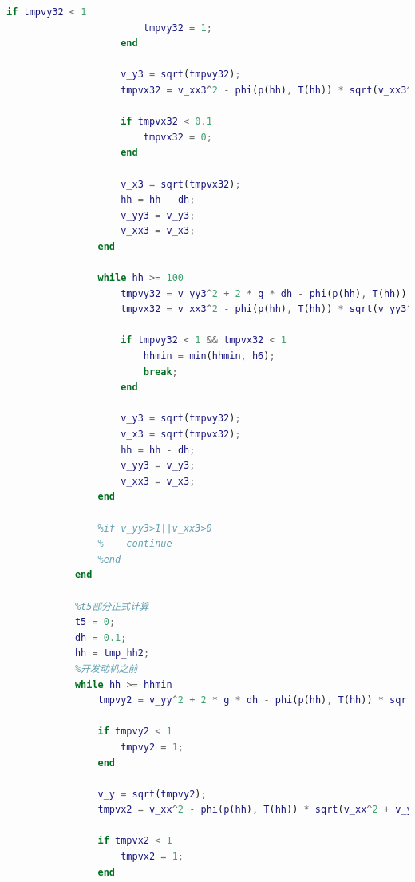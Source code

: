 \documentclass[hyperref,a4paper,UTF8]{ctexart}
\begin{document}
\begin{lstlisting}[language=Matlab]
                    if tmpvy32 < 1
                        tmpvy32 = 1;
                    end

                    v_y3 = sqrt(tmpvy32);
                    tmpvx32 = v_xx3^2 - phi(p(hh), T(hh)) * sqrt(v_xx3^2 + v_yy3^2) * (S_floor + S_para) * dh * v_xx3^2 / ((m - m_floor - m_para - m_hide) * v_yy3);

                    if tmpvx32 < 0.1
                        tmpvx32 = 0;
                    end

                    v_x3 = sqrt(tmpvx32);
                    hh = hh - dh;
                    v_yy3 = v_y3;
                    v_xx3 = v_x3;
                end

                while hh >= 100
                    tmpvy32 = v_yy3^2 + 2 * g * dh - phi(p(hh), T(hh)) * sqrt(v_yy3^2 + v_xx3^2) * S_floor * dh * v_yy3 / (m - m_floor - m_para - m_hide) - 2 * 7500 * dh * v_yy3 / ((m - m_floor - m_para - m_hide) * sqrt(v_yy3^2 + v_xx3^2));
                    tmpvx32 = v_xx3^2 - phi(p(hh), T(hh)) * sqrt(v_yy3^2 + v_xx3^2) * S_floor * dh * v_xx3^2 / (v_yy3 * (m - m_floor - m_para - m_hide)) - 2 * 7500 * dh * v_xx3^2 / (v_yy3 * sqrt(v_yy3^2 + v_xx3^2) * (m - m_floor - m_para - m_hide));

                    if tmpvy32 < 1 && tmpvx32 < 1
                        hhmin = min(hhmin, h6);
                        break;
                    end

                    v_y3 = sqrt(tmpvy32);
                    v_x3 = sqrt(tmpvx32);
                    hh = hh - dh;
                    v_yy3 = v_y3;
                    v_xx3 = v_x3;
                end

                %if v_yy3>1||v_xx3>0
                %    continue
                %end
            end

            %t5部分正式计算
            t5 = 0;
            dh = 0.1;
            hh = tmp_hh2;
            %开发动机之前
            while hh >= hhmin
                tmpvy2 = v_yy^2 + 2 * g * dh - phi(p(hh), T(hh)) * sqrt(v_yy^2 + v_xx^2) * (S_floor + S_para) * dh * v_yy / (m - m_floor - m_para - m_hide);

                if tmpvy2 < 1
                    tmpvy2 = 1;
                end

                v_y = sqrt(tmpvy2);
                tmpvx2 = v_xx^2 - phi(p(hh), T(hh)) * sqrt(v_xx^2 + v_yy^2) * (S_floor + S_para) * dh * v_xx^2 / ((m - m_floor - m_para - m_hide) * v_yy);

                if tmpvx2 < 1
                    tmpvx2 = 1;
                end


\end{lstlisting}
\end{document}

